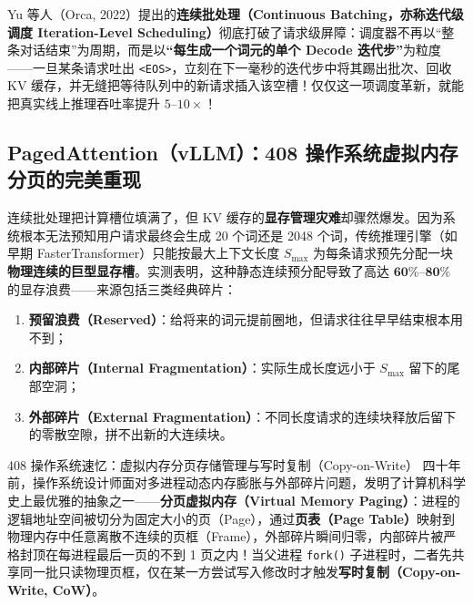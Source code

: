 Yu 等人（Orca, 2022）提出的\textbf{连续批处理（Continuous Batching，亦称迭代级调度 Iteration-Level Scheduling）}彻底打破了请求级屏障：调度器不再以“整条对话结束”为周期，而是以\textbf{“每生成一个词元的单个 Decode 迭代步”}为粒度——一旦某条请求吐出 \texttt{<EOS>}，立刻在下一毫秒的迭代步中将其踢出批次、回收 KV 缓存，并无缝把等待队列中的新请求插入该空槽！仅仅这一项调度革新，就能把真实线上推理吞吐率提升 $5\text{--}10\times$！

\subsection{PagedAttention（vLLM）：408 操作系统虚拟内存分页的完美重现}

连续批处理把计算槽位填满了，但 KV 缓存的\textbf{显存管理灾难}却骤然爆发。因为系统根本无法预知用户请求最终会生成 20 个词还是 2048 个词，传统推理引擎（如早期 FasterTransformer）只能按最大上下文长度 $S_{\max}$ 为每条请求预先分配一块\textbf{物理连续的巨型显存槽}。实测表明，这种静态连续预分配导致了高达 $\mathbf{60\%\text{--}80\%}$ 的显存浪费——来源包括三类经典碎片：
\begin{enumerate}
  \item \textbf{预留浪费（Reserved）}：给将来的词元提前圈地，但请求往往早早结束根本用不到；
  \item \textbf{内部碎片（Internal Fragmentation）}：实际生成长度远小于 $S_{\max}$ 留下的尾部空洞；
  \item \textbf{外部碎片（External Fragmentation）}：不同长度请求的连续块释放后留下的零散空隙，拼不出新的大连续块。
\end{enumerate}

\begin{recallBox}{408 操作系统速忆：虚拟内存分页存储管理与写时复制（Copy-on-Write）}
四十年前，操作系统设计师面对多进程动态内存膨胀与外部碎片问题，发明了计算机科学史上最优雅的抽象之一——\textbf{分页虚拟内存（Virtual Memory Paging）}：进程的逻辑地址空间被切分为固定大小的页（Page），通过\textbf{页表（Page Table）}映射到物理内存中任意离散不连续的页框（Frame），外部碎片瞬间归零，内部碎片被严格封顶在每进程最后一页的不到 1 页之内！当父进程 \texttt{fork()} 子进程时，二者先共享同一批只读物理页框，仅在某一方尝试写入修改时才触发\textbf{写时复制（Copy-on-Write, CoW）}。
\end{recallBox}

